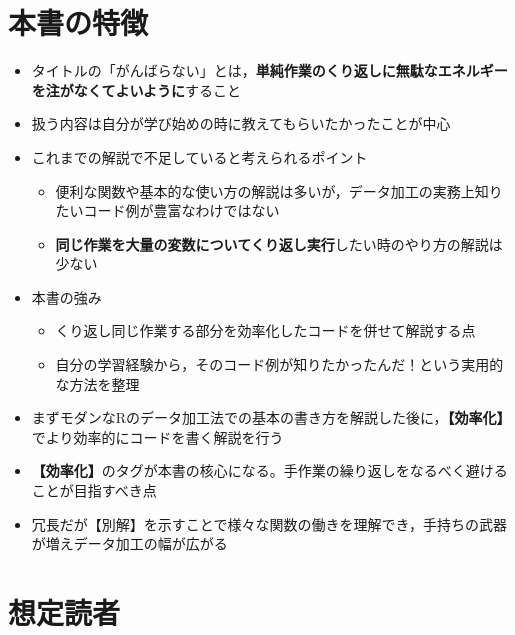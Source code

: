\documentclass[
  xelatex,ja=standard, b5paper]{bxjsbook}
\providecommand{\tightlist}{%
  \setlength{\itemsep}{0pt}\setlength{\parskip}{0pt}}
\begin{document}
\hypertarget{ux672cux66f8ux306eux7279ux5fb4}{%
\section*{本書の特徴}\label{ux672cux66f8ux306eux7279ux5fb4}}

\begin{itemize}
\tightlist
\item
  タイトルの「がんばらない」とは，\textbf{単純作業のくり返しに無駄なエネルギーを注がなくてよいように}すること
\item
  扱う内容は自分が学び始めの時に教えてもらいたかったことが中心
\item
  これまでの解説で不足していると考えられるポイント

  \begin{itemize}
  \tightlist
  \item
    便利な関数や基本的な使い方の解説は多いが，データ加工の実務上知りたいコード例が豊富なわけではない
  \item
    \textbf{同じ作業を大量の変数についてくり返し実行}したい時のやり方の解説は少ない
  \end{itemize}
\item
  本書の強み

  \begin{itemize}
  \tightlist
  \item
    くり返し同じ作業する部分を効率化したコードを併せて解説する点
  \item
    自分の学習経験から，そのコード例が知りたかったんだ！という実用的な方法を整理
  \end{itemize}
\item
  まずモダンなRのデータ加工法での基本の書き方を解説した後に，\textbf{【効率化】}でより効率的にコードを書く解説を行う
\item
  \textbf{【効率化】}のタグが本書の核心になる。手作業の繰り返しをなるべく避けることが目指すべき点
\item
  冗長だが【別解】を示すことで様々な関数の働きを理解でき，手持ちの武器が増えデータ加工の幅が広がる
\end{itemize}

\hypertarget{ux60f3ux5b9aux8aadux8005}{%
\section*{想定読者}\label{ux60f3ux5b9aux8aadux8005}}
\end{document}
